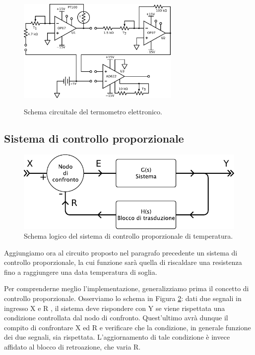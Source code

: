 \begin{figure}[ht]
 \centering
   {\includegraphics[width=0.7\textwidth]{../E06/latex/c1.pdf}}
 \caption{Schema circuitale del termometro elettronico.}
 \label{cir6:term}
\end{figure}

\newpage
\vspace{-2mm}
\subsection{Sistema di controllo proporzionale}

\begin{figure}
\centering
\includegraphics[width=.5\textwidth]{../E06/latex/s2.pdf}
\caption{Schema logico del sistema di controllo proporzionale di temperatura.}
\label{fig6:scheme2}
\end{figure}

Aggiungiamo ora al circuito proposto nel paragrafo precedente un sistema di controllo proporzionale, la cui funzione sarà quella di riscaldare una resistenza fino a raggiungere una data temperatura di soglia.

Per comprenderne meglio l'implementazione, generalizziamo prima il concetto di controllo proporzionale.
Osserviamo lo schema in Figura \ref{fig6:scheme2}: dati due segnali in ingresso X e R , il sistema deve rispondere con Y  se viene rispettata una condizione controllata dal nodo di confronto.
Quest'ultimo avrà dunque il compito di confrontare X ed R e verificare che la condizione, in generale funzione dei due segnali, sia rispettata.
L'aggiornamento di tale condizione è invece affidato al blocco di retroazione, che varia R.

